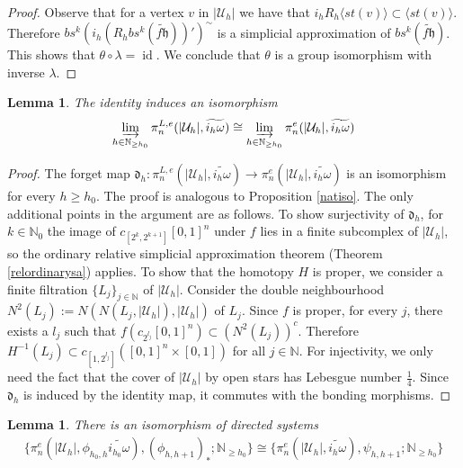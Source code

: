 \documentclass[a4paper,11pt]{article}
\theoremstyle{definition}
\theoremstyle{plain}
\newtheorem{lemma}[definition]{Lemma}
\theoremstyle{remark}
\DeclareMathOperator{\id}{id}
\begin{document}
{\begin{proof}
Observe that for a vertex $v$ in $|\mathcal{U}_{h}|$ we have that $i_{h}R_{h} \langle st(v) \rangle\subset \langle st(v) \rangle $. Therefore 
$bs^k (i_{h}{(R_{h}bs^k (\widetilde{f\mathfrak{h}}))'})^{\sim}$ is a simplicial approximation of $bs^k (\widetilde{f\mathfrak{h}})$. This shows that $\theta\circ \lambda = \id$. We conclude that $\theta$ is a group isomorphism with inverse $\lambda$. 

\end{proof}

\begin{lemma} \label{endLipschitz}The identity induces an isomorphism 
\begin{align*}
\varinjlim_{h\in \mathbb{N}_{\geq h_0}}\pi^{L,e}_{n}(|\mathcal{U}_{h}|, \widetilde{i_{h}\omega}) \cong \varinjlim_{h\in \mathbb{N}_{\geq h_0}}\pi^{e}_{n}(|\mathcal{U}_{h}|, \widetilde{i_{h}\omega})
\end{align*}
\end{lemma}
\begin{proof}
The forget map $\mathfrak{d}_{h}: \pi_n^{L,e}(|\mathcal{U}_{h}|,\widetilde{i_{h}\omega})\rightarrow \pi_n^{e}(|\mathcal{U}_{h}|,\widetilde{i_{h}\omega})$ is an isomorphism for every $h\geq h_0$. The proof is analogous to Proposition \ref{natiso}. The only additional points in the argument are as follows. To show surjectivity of $\mathfrak{d}_{h}$, for $k\in \mathbb{N}_{0}$ the image of $c_{[2^k,2^{k+1}]}[0,1]^n$ under $f$ lies in a finite subcomplex of $|\mathcal{U}_{h}|$, so the ordinary relative simplicial approximation theorem (Theorem \ref{relordinarysa}) applies. To show that the homotopy $H$ is proper, we consider a finite filtration $\{L_{j}\}_{j\in \mathbb{N}}$ of $|\mathcal{U}_{h}|$. Consider the double neighbourhood $N^2(L_{j}):=N(N(L_{j},|\mathcal{U}_{h}|), |\mathcal{U}_{h}|)$ of $L_{j}$. Since $f$ is proper, for every $j$, there exists a $l_{j}$ such that $f (c_{2^{l_j}} [0,1]^n) \subset (N^2(L_{j}))^c$. Therefore $H^{-1}(L_{j}) \subset c_{[1,2^{l_j}]}([0,1]^n \times [0,1])$ for all $j\in \mathbb{N}$. For injectivity, we only need the fact that the cover of $|\mathcal{U}_{h}|$ by open stars has Lebesgue number $\frac{1}{4}$. Since $\mathfrak{d}_{h}$ is induced by the identity map, it commutes with the bonding morphisms.
\end{proof} 

\begin{lemma} \label{diff}
There is an isomorphism of directed systems 
\begin{align*}
\{\pi_{n}^{e}(|\mathcal{U}_{h}|,\phi_{h_0,h} \widetilde{i_{h_0}\omega}), (\phi_{h,h+1})_{\ast}; \mathbb{N}_{\geq h_0}\} \cong \{\pi_{n}^{e}(|\mathcal{U}_{h}|,\widetilde{i_{h}\omega}), \psi_{h,h+1}; \mathbb{N}_{\geq h_0}\}
\end{align*}
\end{lemma}

}
\end{document}
